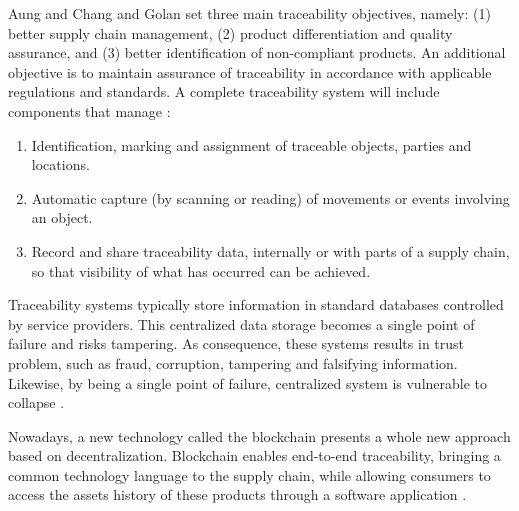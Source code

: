 Aung and Chang \cite{aung2014traceability} and Golan \cite{golan2004traceability} set three main traceability objectives, namely: (1) better supply chain management, (2) product differentiation and quality assurance, and (3) better identification of non-compliant products. An additional objective is to maintain assurance of traceability in accordance with applicable regulations and standards. A complete traceability system will include components that manage \cite{vargas2017trazabilidad}:

\begin{enumerate}
\item Identification, marking and assignment of traceable objects, parties and locations.
\item Automatic capture (by scanning or reading) of movements or events involving an object.
\item Record and share traceability data, internally or with parts of a supply chain, so that visibility of what has occurred can be achieved.
\end{enumerate}

Traceability systems typically store information in standard databases controlled by service providers. This centralized data storage becomes a single point of failure and risks tampering. As consequence, these systems results in trust problem, such as fraud, corruption, tampering and falsifying information. Likewise, by being a single point of failure, centralized system is vulnerable to collapse \cite{tian2017supply}.

Nowadays, a new technology called the blockchain presents a whole new approach based on decentralization. Blockchain enables end-to-end traceability, bringing a common technology language to the supply chain, while allowing consumers to access the assets history of these products through a software application \cite{galvez2018future}.